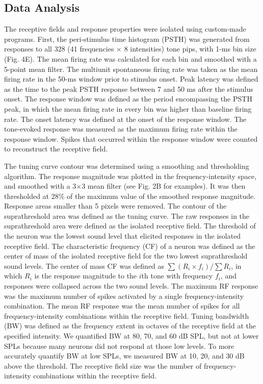 \subsection{Data Analysis}

The receptive fields and response properties were isolated using custom-made programs. First, the peri-stimulus time histogram (PSTH) was generated from responses to all 328 (41 frequencies $\times$ 8 intensities) tone pips, with 1-ms bin size (Fig. 4E). The mean firing rate was calculated for each bin and smoothed with a 5-point mean filter. The multiunit spontaneous firing rate was taken as the mean firing rate in the 50-ms window prior to stimulus onset. Peak latency was defined as the time to the peak PSTH response between 7 and 50 ms after the stimulus onset. The response window was defined as the period encompassing the PSTH peak, in which the mean firing rate in every bin was higher than baseline firing rate. The onset latency was defined at the onset of the response window. The tone-evoked response was measured as the maximum firing rate within the response window. Spikes that occurred within the response window were counted to reconstruct the receptive field.

The tuning curve contour was determined using a smoothing and thresholding algorithm. The response magnitude was plotted in the frequency-intensity space, and smoothed with a 3$\times$3 mean filter (see Fig. 2B for examples). It was then thresholded at 28\% of the maximum value of the smoothed response magnitude. Response areas smaller than 5 pixels were removed. The contour of the suprathreshold area was defined as the tuning curve. The raw responses in the suprathreshold area were defined as the isolated receptive field. The threshold of the neuron was the lowest sound level that elicited responses in the isolated receptive field. The characteristic frequency (CF) of a neuron was defined as the center of mass of the isolated receptive field for the two lowest suprathreshold sound levels. The center of mass CF was defined as $\sum{(R_i \times f_i)}/\sum{R_i}$, in which $R_i$ is the response magnitude to the $i$th tone with frequency $f_i$, and responses were collapsed across the two sound levels. The maximum RF response was the maximum number of spikes activated by a single frequency-intensity combination. The mean RF response was the mean number of spikes for all frequency-intensity combinations within the receptive field. Tuning bandwidth (BW) was defined as the frequency extent in octaves of the receptive field at the specified intensity. We quantified BW at 80, 70, and 60 dB SPL, but not at lower SPLs because many neurons did not respond at those low levels. To more accurately quantify BW at low SPLs, we measured BW at 10, 20, and 30 dB above the threshold. The receptive field size was the number of frequency-intensity combinations within the receptive field.


